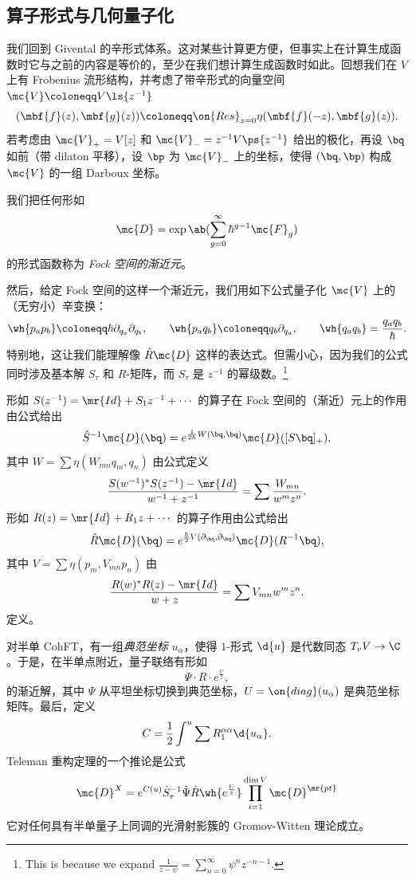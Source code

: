 \subsection{算子形式与几何量子化}%
\label{sub:Operator formalism and geometric quantization}

我们回到 Givental 的辛形式体系。这对某些计算更方便，但事实上在计算生成函数时它与之前的内容是等价的，至少在我们想计算生成函数时如此。回想我们在 \(V\) 上有 Frobenius 流形结构，并考虑了带辛形式的向量空间 \(\mc{V}\coloneqq V\ls{z^{-1}}\)
\[ (\mbf{f}(z), \mbf{g}(z)) \coloneqq \on{Res}_{z=0} \eta(\mbf{f}(-z), \mbf{g}(z)). \]
若考虑由 \(\mc{V}_+ = V[z]\) 和 \(\mc{V}_- = z^{-1}V\ps{z^{-1}}\) 给出的极化，再设 \(\bq\) 如前（带 dilaton 平移），设 \(\bp\) 为 \(\mc{V}_-\) 上的坐标，使得 \((\bq, \bp)\) 构成 \(\mc{V}\) 的一组 Darboux 坐标。

\begin{defn}
    我们把任何形如
    \[ \mc{D} = \exp\ab(\sum_{g=0}^{\infty} \hbar^{g-1} \mc{F}_g) \]
    的形式函数称为 \textit{Fock 空间的渐近元}。
\end{defn}

然后，给定 Fock 空间的这样一个渐近元，我们用如下公式量子化 \(\mc{V}\) 上的（无穷小）辛变换：
\[ \wh{p_a p_b} \coloneqq \hbar \partial_{q_a} \partial_{q_b}, \qquad \wh{p_a q_b} \coloneqq q_b \partial_{q_a}, \qquad \wh{q_a q_b} = \frac{q_a q_b}{\hbar}. \]
特别地，这让我们能理解像 \(\hat{R} \mc{D}\) 这样的表达式。但需小心，因为我们的公式同时涉及基本解 \(S_{\tau}\) 和 \(R\)-矩阵，而 \(S_{\tau}\) 是 \(z^{-1}\) 的幂级数。\footnote{This is because we expand $\frac{1}{z-\psi} = \sum_{n=0}^{\infty} \psi^n z^{-n-1}$.}

\begin{thm}
    形如 \(S(z^{-1}) = \mr{Id} + S_1 z^{-1} + \cdots\) 的算子在 Fock 空间的（渐近）元上的作用由公式给出
    \[ \hat{S}^{-1} \mc{D}(\bq) = e^{\frac{1}{2\hbar}W(\bq,\bq)} \mc{D}([S \bq]_+), \]
    其中 \(W = \sum \eta(W_{mn}q_m, q_n)\) 由公式定义
    \[ \frac{S(w^{-1})^* S(z^{-1}) - \mr{Id}}{w^{-1}+z^{-1}} = \sum \frac{W_{mn}}{w^m z^n}. \]
    形如 \(R(z) = \mr{Id} + R_1 z + \cdots\) 的算子作用由公式给出
    \[ \hat{R}\mc{D}(\bq) = e^{\frac{\hbar}{2} V(\partial_{\bq}, \partial_{\bq})} \mc{D}(R^{-1} \bq), \]
    其中 \(V = \sum \eta(p_m, V_{mn} p_n)\) 由
    \[ \frac{R(w)^* R(z) - \mr{Id}}{w+z} = \sum V_{mn} w^m z^n. \]
    定义。
\end{thm}

对半单 CohFT，有一组\textit{典范坐标} \(u_{\alpha}\)，使得 \(1\)-形式 \(\d{u}\) 是代数同态 \(T_v V \to \C\)。于是，在半单点附近，量子联络有形如
\[ \Psi \cdot  R \cdot e^{\frac{U}{z}}, \]
的渐近解，其中 \(\Psi\) 从平坦坐标切换到典范坐标，\(U = \on{diag}(u_{\alpha})\) 是典范坐标矩阵。最后，定义
\[ C = \frac{1}{2} \int^u \sum R_1^{\alpha\alpha} \d{u_{\alpha}}. \]
Teleman 重构定理的一个推论是公式
\[ \mc{D}^X = e^{C(u)} \hat{S}^{-1}_{\tau} \hat{\Psi} \hat{R} \wh{e^{\frac{U}{z}}} \prod_{i=1}^{\dim V} \mc{D}^{\mr{pt}} \]
它对任何具有半单量子上同调的光滑射影簇的 Gromov-Witten 理论成立。


